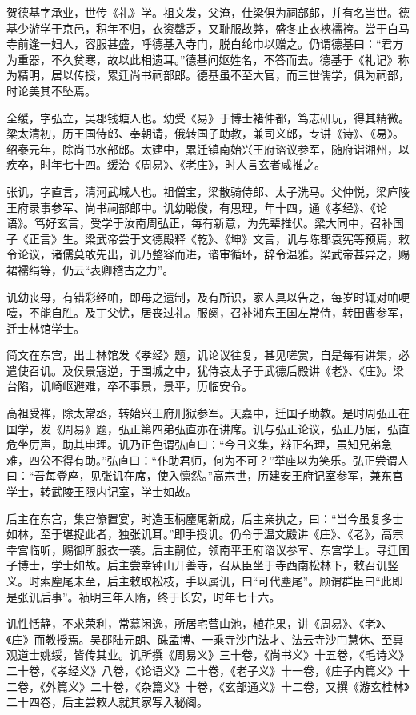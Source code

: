 \documentclass[]{article}
\begin{document}
贺德基字承业，世传《礼》学。祖文发，父淹，仕梁俱为祠部郎，并有名当世。德基少游学于京邑，积年不归，衣资罄乏，又耻服故弊，盛冬止衣裌襦袴。尝于白马寺前逢一妇人，容服甚盛，呼德基入寺门，脱白纶巾以赠之。仍谓德基曰：``君方为重器，不久贫寒，故以此相遗耳。''德基问妪姓名，不答而去。德基于《礼记》称为精明，居以传授，累迁尚书祠部郎。德基虽不至大官，而三世儒学，俱为祠部，时论美其不坠焉。

全缓，字弘立，吴郡钱塘人也。幼受《易》于博士褚仲都，笃志研玩，得其精微。梁太清初，历王国侍郎、奉朝请，俄转国子助教，兼司义郎，专讲《诗》、《易》。绍泰元年，除尚书水部郎。太建中，累迁镇南始兴王府谘议参军，随府诣湘州，以疾卒，时年七十四。缓治《周易》、《老庄》，时人言玄者咸推之。

张讥，字直言，清河武城人也。祖僧宝，梁散骑侍郎、太子洗马。父仲悦，梁庐陵王府录事参军、尚书祠部郎中。讥幼聪俊，有思理，年十四，通《孝经》、《论语》。笃好玄言，受学于汝南周弘正，每有新意，为先辈推伏。梁大同中，召补国子《正言》生。梁武帝尝于文德殿释《乾》、《坤》文言，讥与陈郡袁宪等预焉，敕令论议，诸儒莫敢先出，讥乃整容而进，谘审循环，辞令温雅。梁武帝甚异之，赐裙襦绢等，仍云``表卿稽古之力''。

讥幼丧母，有错彩经帕，即母之遗制，及有所识，家人具以告之，每岁时辄对帕哽噎，不能自胜。及丁父忧，居丧过礼。服阕，召补湘东王国左常侍，转田曹参军，迁士林馆学士。

简文在东宫，出士林馆发《孝经》题，讥论议往复，甚见嗟赏，自是每有讲集，必遣使召讥。及侯景寇逆，于围城之中，犹侍哀太子于武德后殿讲《老》、《庄》。梁台陷，讥崎岖避难，卒不事景，景平，历临安令。

高祖受禅，除太常丞，转始兴王府刑狱参军。天嘉中，迁国子助教。是时周弘正在国学，发《周易》题，弘正第四弟弘直亦在讲席。讥与弘正论议，弘正乃屈，弘直危坐厉声，助其申理。讥乃正色谓弘直曰：``今日义集，辩正名理，虽知兄弟急难，四公不得有助。''弘直曰：``仆助君师，何为不可？''举座以为笑乐。弘正尝谓人曰：``吾每登座，见张讥在席，使入懔然。''高宗世，历建安王府记室参军，兼东宫学士，转武陵王限内记室，学士如故。

后主在东宫，集宫僚置宴，时造玉柄麈尾新成，后主亲执之，曰：``当今虽复多士如林，至于堪捉此者，独张讥耳。''即手授讥。仍令于温文殿讲《庄》、《老》，高宗幸宫临听，赐御所服衣一袭。后主嗣位，领南平王府谘议参军、东宫学士。寻迁国子博士，学士如故。后主尝幸钟山开善寺，召从臣坐于寺西南松林下，敕召讥竖义。时索麈尾未至，后主敕取松枝，手以属讥，曰``可代麈尾''。顾谓群臣曰``此即是张讥后事''。祯明三年入隋，终于长安，时年七十六。

讥性恬静，不求荣利，常慕闲逸，所居宅营山池，植花果，讲《周易》、《老》、《庄》而教授焉。吴郡陆元朗、硃孟博、一乘寺沙门法才、法云寺沙门慧休、至真观道士姚绥，皆传其业。讥所撰《周易义》三十卷，《尚书义》十五卷，《毛诗义》二十卷，《孝经义》八卷，《论语义》二十卷，《老子义》十一卷，《庄子内篇义》十二卷，《外篇义》二十卷，《杂篇义》十卷，《玄部通义》十二卷，又撰《游玄桂林》二十四卷，后主尝敕人就其家写入秘阁。
\end{document}
